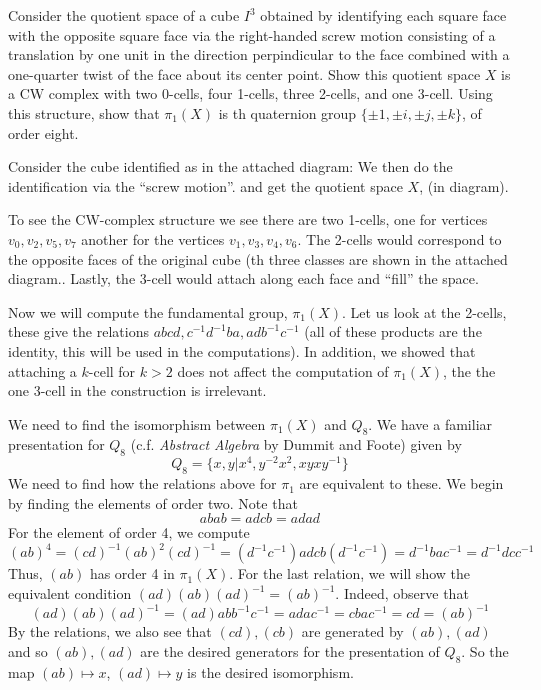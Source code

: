\documentclass{article}
\begin{document}
\begin{problem}{2}{\parindent}
  Consider the quotient space of a cube $I^3$ obtained by identifying
  each square face with the opposite square face via the right-handed
  screw motion consisting of a translation by one unit in the
  direction perpindicular to the face combined with a one-quarter
  twist of the face about its center point. Show this quotient space
  $X$ is a CW complex with two 0-cells, four 1-cells, three 2-cells,
  and one 3-cell. Using this structure, show that $\pi_1(X)$ is th
  quaternion group $\{\pm 1, \pm i, \pm j, \pm k\}$, of order eight.
\end{problem}

\begin{solution}{\parindent}
  Consider the cube identified as in the attached diagram: We then do
  the identification via the ``screw motion''. and get the quotient
  space $X$, (in diagram).

  To see the CW-complex structure we see there are two 1-cells, one
  for vertices $v_0,v_2,v_5,v_7$ another for the vertices
  $v_1,v_3,v_4,v_6$. The 2-cells would correspond to the opposite
  faces of the original cube (th three classes are shown in the
  attached diagram.. Lastly, the 3-cell would attach along each face
  and ``fill'' the space.

  Now we will compute the fundamental group, $\pi_1(X)$. Let us look
  at the 2-cells, these give the relations $abcd, c^{-1}d^{-1}ba,
  adb^{-1}c^{-1}$ (all of these products are the identity, this will
  be used in the computations). In addition, we showed that attaching
  a $k$-cell for $k > 2$ does not affect the computation of
  $\pi_1(X)$, the the one 3-cell in the construction is irrelevant.

  We need to find the isomorphism between $\pi_1(X)$ and $Q_8$. We
  have a familiar presentation for $Q_8$ (c.f. \textit{Abstract
    Algebra} by Dummit and Foote) given by
  \[
  Q_8 = \lbrace x,y | x^4, y^{-2}x^2, xyxy^{-1}\rbrace
  \]
  We need to find how the relations above for $\pi_1$ are equivalent
  to these. We begin by finding the elements of order two. Note that
  \[
  abab = adcb = adad
  \]
  For the element of order 4, we compute
  \[
  (ab)^4 = (cd)^{-1}(ab)^2(cd)^{-1} = (d^{-1}c^{-1})adcb(d^{-1}c^{-1})
  = d^{-1}bac^{-1} = d^{-1}dcc^{-1}
  \]
  Thus, $(ab)$ has order 4 in $\pi_1(X)$. For the last relation, we
  will show the equivalent condition $(ad)(ab)(ad)^{-1} =
  (ab)^{-1}$. Indeed, observe that
  \[
  (ad)(ab)(ad)^{-1} = (ad)abb^{-1}c^{-1} = adac^{-1} = cbac^{-1} = cd = (ab)^{-1}
  \]
  By the relations, we also see that $(cd), (cb)$ are generated by
  $(ab),(ad)$ and so $(ab),(ad)$ are the desired generators for the
  presentation of $Q_8$. So the map $(ab) \mapsto x$, $(ad) \mapsto y$
  is the desired isomorphism.
\end{solution}
\end{document}

